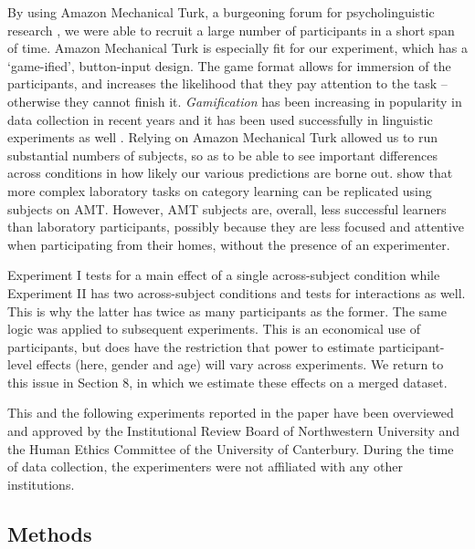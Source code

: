 \documentclass{frontiersSCNS} %
\begin{document}
By using Amazon Mechanical Turk, a burgeoning forum for psycholinguistic research \citep{munro2010crowdsourcing}, we were able to recruit a large number of participants in a short span of time. Amazon Mechanical Turk is especially fit for our experiment, which has a `game-ified', button-input design. The game format allows for immersion of the participants, and increases the likelihood that they pay attention to the task -- otherwise they cannot finish it. \emph{Gamification} has been increasing in popularity in data collection in recent years \citep{von2006games} and it has been used successfully in linguistic experiments as well \citep{fedzechkina2012language,schumacher2014}. Relying on Amazon Mechanical Turk allowed us to run substantial numbers of subjects, so as to be able to see important differences across conditions in how likely our various predictions are borne out. \cite{crump2013evaluating} show that more complex laboratory tasks on category learning can be replicated using subjects on AMT. However, AMT subjects are, overall, less successful learners than laboratory participants, possibly because they are less focused and attentive when participating from their homes, without the presence of an experimenter. 


 Experiment I tests for a main effect of a single across-subject condition while Experiment II has two across-subject conditions and tests for interactions as well. This is why the latter has twice as many participants as the former. The same logic was applied to subsequent experiments. This is an economical use of participants, but does have the restriction that power to estimate participant-level effects (here, gender and age) will vary across experiments. We return to this issue in Section 8, in which we estimate these effects on a merged dataset.


This and the following experiments reported in the paper have been overviewed and approved by the Institutional Review Board of Northwestern University and the Human Ethics Committee of the University of Canterbury. During the time of data collection, the experimenters were not affiliated with any other institutions.

\subsection{Methods \label{exp1methods}}
\end{document}
